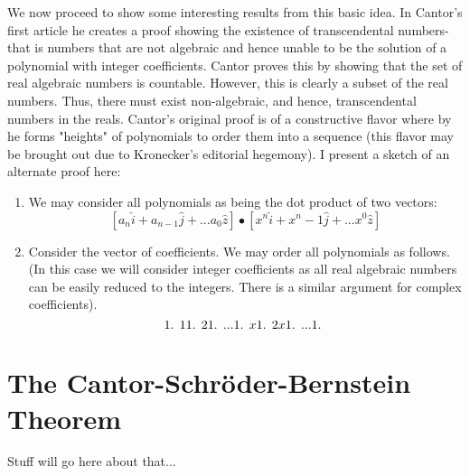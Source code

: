 \documentclass{article}
\begin{document}
\par We now proceed to show some interesting results from this basic idea. In Cantor's first article he creates a proof showing the existence of transcendental numbers- that is numbers that are not algebraic and hence unable to be the solution of a polynomial with integer coefficients. Cantor proves this by showing that the set of real algebraic numbers is countable. However, this is clearly a subset of the real numbers. Thus, there must exist non-algebraic, and hence, transcendental numbers in the reals. Cantor's original proof is of a constructive flavor where by he forms "heights" of polynomials to order them into a sequence (this flavor may be brought out due to Kronecker's editorial hegemony). I present a sketch of an alternate proof here:
\begin{enumerate}
\item We may consider all polynomials as being the dot product of two vectors:
\[
[a_n\hat{i}+a_{n-1}\hat{j}+...a_0\hat{z}]\bullet[x^n\hat{i}+x^n-1\hat{j}+...x^0\hat{z}]
\]
\item Consider the vector of coefficients. We may order all polynomials as follows. (In this case we will consider integer coefficients as all real algebraic numbers can be easily reduced to the integers. There is a similar argument for complex coefficients). 
\[
\text{1. } 1 \text{\\}
\text{1. } 2 \text{\\}
\text{1. } ... \text{\\}
\text{1. } x \text{\\}
\text{1. } 2x \text{\\}
\text{1. } ... \text{\\}
\text{1. }  \text{\\}
\]
\end{enumerate}
 
\section{The Cantor-Schr\"oder-Bernstein Theorem}
Stuff will go here about that...
\end{document}
